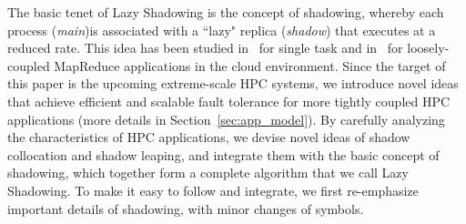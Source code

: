 



The basic tenet of Lazy Shadowing is the concept of shadowing, whereby each process (\textit{main})is associated with a ``lazy" replica (\textit{shadow}) that executes at a reduced rate. 
This idea has been studied in~\cite{mills_2014_icnc} for single task and in~\cite{cui_en7085151,cui_2014_closer} for loosely-coupled MapReduce applications in the cloud environment. 
Since the target of this paper is the upcoming extreme-scale HPC systems, we introduce novel ideas that achieve efficient and scalable fault tolerance for more 
tightly coupled HPC applications (more details in Section~\ref{sec:app_model}). By carefully analyzing the characteristics of HPC applications, we devise novel ideas 
of shadow collocation and shadow leaping, and integrate them with the basic concept of shadowing, which together form a complete algorithm that we call Lazy Shadowing. 
To make it easy to follow and integrate, we first re-emphasize important details of shadowing, with minor changes of symbols.

